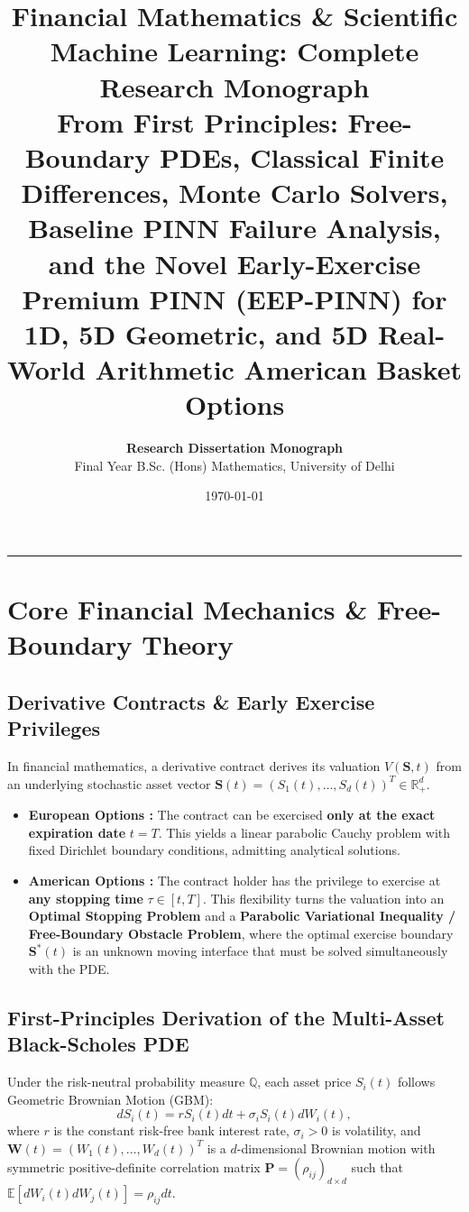 \documentclass[11pt,a4paper]{article}
\title{\textbf{\LARGE Financial Mathematics \& Scientific Machine Learning: Complete Research Monograph}\\[0.3em]
\large \textbf{From First Principles: Free-Boundary PDEs, Classical Finite Differences, Monte Carlo Solvers, Baseline PINN Failure Analysis, and the Novel Early-Exercise Premium PINN (EEP-PINN) for 1D, 5D Geometric, and 5D Real-World Arithmetic American Basket Options}}
\author{\textbf{Research Dissertation Monograph} \\ Final Year B.Sc. (Hons) Mathematics, University of Delhi}
\date{\today}
\begin{document}
\maketitle
\tableofcontents
\vspace{1em}
\hrule
\vspace{1.5em}

\section{Core Financial Mechanics \& Free-Boundary Theory}

\subsection{Derivative Contracts \& Early Exercise Privileges}
In financial mathematics, a derivative contract derives its valuation $V(\mathbf{S}, t)$ from an underlying stochastic asset vector $\mathbf{S}(t) = (S_1(t), \dots, S_d(t))^T \in \mathbb{R}_+^d$.
\begin{itemize}[leftmargin=1.5em]
    \item \textbf{European Options \cite{black1973pricing}:} The contract can be exercised \textbf{only at the exact expiration date} $t = T$. This yields a linear parabolic Cauchy problem with fixed Dirichlet boundary conditions, admitting analytical solutions.
    \item \textbf{American Options \cite{merton1973theory, kim1990analytic}:} The contract holder has the privilege to exercise at \textbf{any stopping time} $\tau \in [t, T]$. This flexibility turns the valuation into an \textbf{Optimal Stopping Problem} and a \textbf{Parabolic Variational Inequality / Free-Boundary Obstacle Problem}, where the optimal exercise boundary $\mathbf{S}^*(t)$ is an unknown moving interface that must be solved simultaneously with the PDE.
\end{itemize}

\subsection{First-Principles Derivation of the Multi-Asset Black-Scholes PDE}
Under the risk-neutral probability measure $\mathbb{Q}$, each asset price $S_i(t)$ follows Geometric Brownian Motion (GBM):
\begin{equation}
    dS_i(t) = r S_i(t) dt + \sigma_i S_i(t) dW_i(t),
\end{equation}
where $r$ is the constant risk-free bank interest rate, $\sigma_i > 0$ is volatility, and $\mathbf{W}(t) = (W_1(t), \dots, W_d(t))^T$ is a $d$-dimensional Brownian motion with symmetric positive-definite correlation matrix $\mathbf{P} = (\rho_{ij})_{d \times d}$ such that $\mathbb{E}[dW_i(t) dW_j(t)] = \rho_{ij} dt$.
\end{document}

